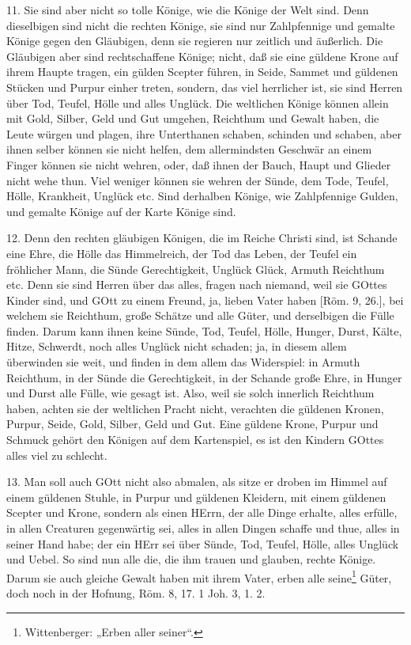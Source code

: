 11. Sie sind aber nicht so tolle Könige, wie die Könige der Welt sind. Denn dieselbigen sind nicht die rechten Könige, sie sind nur Zahlpfennige und gemalte Könige gegen den Gläubigen, denn sie regieren nur zeitlich und äußerlich. Die Gläubigen aber sind rechtschaffene Könige; nicht, daß sie eine güldene Krone auf ihrem Haupte tragen, ein gülden Scepter führen, in Seide, Sammet und güldenen Stücken und Purpur einher treten, sondern, das viel herrlicher ist, sie sind Herren über Tod, Teufel, Hölle und alles Unglück. Die weltlichen Könige können allein mit Gold, Silber, Geld und Gut umgehen, Reichthum und Gewalt haben, die Leute würgen und plagen, ihre Unterthanen schaben, schinden und schaben, aber ihnen selber können sie nicht helfen, dem allermindsten Geschwär an einem Finger können sie nicht wehren, oder, daß ihnen der Bauch, Haupt und Glieder nicht wehe thun. Viel weniger können sie wehren der Sünde, dem Tode, Teufel, Hölle, Krankheit, Unglück etc. Sind derhalben Könige, wie Zahlpfennige Gulden, und gemalte Könige auf der Karte Könige sind.

12. Denn den rechten gläubigen Königen, die im Reiche Christi sind, ist Schande eine Ehre, die Hölle das Himmelreich, der Tod das Leben, der Teufel ein fröhlicher Mann, die Sünde Gerechtigkeit, Unglück Glück, Armuth Reichthum etc. Denn sie sind Herren über das alles, fragen nach niemand, weil sie GOttes Kinder sind, und GOtt zu einem Freund, ja, lieben Vater haben [Röm. 9, 26.], bei welchem sie Reichthum, große Schätze und alle Güter, und derselbigen die Fülle finden. Darum kann ihnen keine Sünde, Tod, Teufel, Hölle, Hunger, Durst, Kälte, Hitze, Schwerdt, noch alles Unglück nicht schaden; ja, in diesem allem überwinden sie weit, und finden in dem allem das Widerspiel: in Armuth Reichthum, in der Sünde die Gerechtigkeit, in der Schande große Ehre, in Hunger und Durst alle Fülle, wie gesagt ist. Also, weil sie solch innerlich Reichthum haben, achten sie der weltlichen Pracht nicht, verachten die güldenen Kronen, Purpur, Seide, Gold, Silber, Geld und Gut. Eine güldene Krone, Purpur und Schmuck gehört den Königen auf dem Kartenspiel, es ist den Kindern GOttes alles viel zu schlecht.

13. Man soll auch GOtt nicht also abmalen, als sitze er droben im Himmel auf einem güldenen Stuhle, in Purpur und güldenen Kleidern, mit einem güldenen Scepter und Krone, sondern als einen HErrn, der alle Dinge erhalte, alles erfülle, in allen Creaturen gegenwärtig sei, alles in allen Dingen schaffe und thue, alles in seiner Hand habe; der ein HErr sei über Sünde, Tod, Teufel, Hölle, alles Unglück und Uebel. So sind nun alle die, die ihm trauen und glauben, rechte Könige. Darum sie auch gleiche Gewalt haben mit ihrem Vater, erben alle seine\footnote{Wittenberger: „Erben aller seiner“.} Güter, doch noch in der Hofnung, Röm. 8, 17. 1 Joh. 3, 1. 2.


